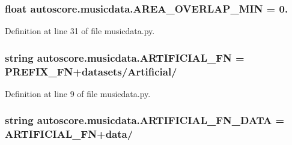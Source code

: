 \subsubsection[{\texorpdfstring{A\+R\+E\+A\+\_\+\+O\+V\+E\+R\+L\+A\+P\+\_\+\+M\+IN}{AREA_OVERLAP_MIN}}]{\setlength{\rightskip}{0pt plus 5cm}float autoscore.\+musicdata.\+A\+R\+E\+A\+\_\+\+O\+V\+E\+R\+L\+A\+P\+\_\+\+M\+IN = 0.}\hypertarget{namespaceautoscore_1_1musicdata_aa2545f5fe006ee17a14f604063447c90}{}\label{namespaceautoscore_1_1musicdata_aa2545f5fe006ee17a14f604063447c90}


Definition at line 31 of file musicdata.\+py.

\subsubsection[{\texorpdfstring{A\+R\+T\+I\+F\+I\+C\+I\+A\+L\+\_\+\+FN}{ARTIFICIAL_FN}}]{\setlength{\rightskip}{0pt plus 5cm}string autoscore.\+musicdata.\+A\+R\+T\+I\+F\+I\+C\+I\+A\+L\+\_\+\+FN = {\bf P\+R\+E\+F\+I\+X\+\_\+\+FN}+\textquotesingle{}datasets/Artificial/\textquotesingle{}}\hypertarget{namespaceautoscore_1_1musicdata_acfb5d195ffef1d88681f6e3555219925}{}\label{namespaceautoscore_1_1musicdata_acfb5d195ffef1d88681f6e3555219925}


Definition at line 9 of file musicdata.\+py.

\subsubsection[{\texorpdfstring{A\+R\+T\+I\+F\+I\+C\+I\+A\+L\+\_\+\+F\+N\+\_\+\+D\+A\+TA}{ARTIFICIAL_FN_DATA}}]{\setlength{\rightskip}{0pt plus 5cm}string autoscore.\+musicdata.\+A\+R\+T\+I\+F\+I\+C\+I\+A\+L\+\_\+\+F\+N\+\_\+\+D\+A\+TA = {\bf A\+R\+T\+I\+F\+I\+C\+I\+A\+L\+\_\+\+FN}+\textquotesingle{}data/\textquotesingle{}}\hypertarget{namespaceautoscore_1_1musicdata_a47cc3f7854416092969250879a8a0d7f}{}\label{namespaceautoscore_1_1musicdata_a47cc3f7854416092969250879a8a0d7f}


